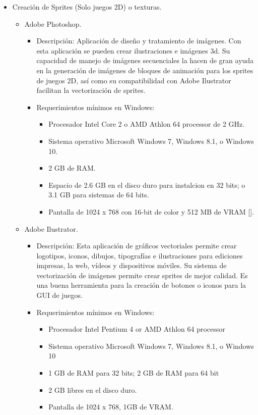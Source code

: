	\begin{itemize}
		\item Creación de Sprites (Solo juegos 2D) o texturas.
			\begin{itemize}
				\item Adobe Photoshop.
					\begin{itemize}
						\item Descripción: Aplicación de diseño y tratamiento de imágenes. Con esta aplicación se pueden crear ilustraciones e imágenes 3d. Su capacidad de manejo de imágenes secuenciales la hacen de gran ayuda en la generación de imágenes de bloques de animación para los sprites de juegos 2D, así como su compatibilidad con Adobe Ilustrator facilitan la vectorización de sprites.
						\item Requerimientos mínimos en Windows:
						\begin{itemize}
							\item Procesador Intel Core 2 o AMD Athlon 64 processor de 2 GHz.
							\item Sistema operativo Microsoft Windows 7, Windows 8.1, o Windows 10.
							\item 2 GB de RAM.
							\item Espacio de 2.6 GB en el disco duro para instalcion en 32 bits; o 3.1 GB para sistemas de 64 bits.
							\item Pantalla de 1024 x 768 con 16-bit de color y 512 MB de VRAM [].
						\end{itemize}
					\end{itemize}
				\item Adobe Ilustrator.
					\begin{itemize}
						\item Descripción: Esta aplicación de gráficos vectoriales permite crear logotipos, iconos, dibujos, tipografías e ilustraciones para ediciones impresas, la web, vídeos y dispositivos móviles. Su sistema de vectorización de imágenes permite crear sprites de mejor calidad.  Es una buena herramienta para la creación de botones o iconos para la GUI de juegos.
						\item Requerimientos mínimos en Windows:
							\begin{itemize}
								\item Procesador Intel Pentium 4 or AMD Athlon 64 processor
								\item Sistema operativo Microsoft Windows 7, Windows 8.1, o Windows 10
								\item 1 GB de RAM para 32 bits; 2 GB de RAM para 64 bit
								\item 2 GB libres en el disco duro.
								\item Pantalla de 1024 x 768, 1GB de VRAM.
							\end{itemize}


\end{itemize}
\end{itemize}
\end{itemize}
